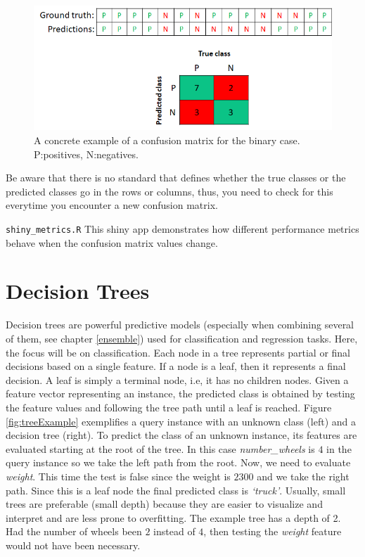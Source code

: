 \documentclass[
  11pt,
]{krantz}
\makeatletter
\newenvironment{kframe}{%
\medskip{}
\setlength{\fboxsep}{.8em}
 \def\at@end@of@kframe{}%
 \ifinner\ifhmode%
  \def\at@end@of@kframe{\end{minipage}}%
  \begin{minipage}{\columnwidth}%
 \fi\fi%
 \def\FrameCommand##1{\hskip\@totalleftmargin \hskip-\fboxsep
 \colorbox{shadecolor}{##1}\hskip-\fboxsep
     \hskip-\linewidth \hskip-\@totalleftmargin \hskip\columnwidth}%
 \MakeFramed {\advance\hsize-\width
   \@totalleftmargin\z@ \linewidth\hsize
   \@setminipage}}%
 {\par\unskip\endMakeFramed%
 \at@end@of@kframe}
\newenvironment{rmdblock}[1]
  {
  \begin{itemize}
  \renewcommand{\labelitemi}{
    \raisebox{-.7\height}[0pt][0pt]{
      {\setkeys{Gin}{width=3em,keepaspectratio}\texttt{[image: images/icons/\#1]}}
    }
  }
  \setlength{\fboxsep}{1em}
  \begin{kframe}
  \item
  }
  {
  \end{kframe}
  \end{itemize}
  }
\newenvironment{rmdcaution}
  {\begin{rmdblock}{caution}}
  {\end{rmdblock}}
\newenvironment{rmdshiny}
  {\begin{rmdblock}{touch}}
  {\end{rmdblock}}
\makeatother
\begin{document}
\begin{figure}

{\centering \includegraphics[width=0.9\linewidth]{images/binaryCM2} 

}

\caption{A concrete example of a  confusion matrix for the binary case. P:positives, N:negatives.}\label{fig:binaryCM2}
\end{figure}

\begin{rmdcaution}
Be aware that there is no standard that defines whether the true classes or the predicted classes go in the rows or columns, thus, you need to check for this everytime you encounter a new confusion matrix.
\end{rmdcaution}

\begin{rmdshiny}
\texttt{shiny\_metrics.R} This shiny app demonstrates how different performance metrics behave when the confusion matrix values change.
\end{rmdshiny}

\hypertarget{decision-trees}{%
\section{Decision Trees}\label{decision-trees}}

Decision trees are powerful predictive models (especially when combining several of them, see chapter \ref{ensemble}) used for classification and regression tasks. Here, the focus will be on classification. Each node in a tree represents partial or final decisions based on a single feature. If a node is a leaf, then it represents a final decision. A leaf is simply a terminal node, i.e, it has no children nodes. Given a feature vector representing an instance, the predicted class is obtained by testing the feature values and following the tree path until a leaf is reached. Figure \ref{fig:treeExample} exemplifies a query instance with an unknown class (left) and a decision tree (right). To predict the class of an unknown instance, its features are evaluated starting at the root of the tree. In this case \emph{number\_wheels} is \(4\) in the query instance so we take the left path from the root. Now, we need to evaluate \emph{weight}. This time the test is false since the weight is \(2300\) and we take the right path. Since this is a leaf node the final predicted class is \emph{`truck'}. Usually, small trees are preferable (small depth) because they are easier to visualize and interpret and are less prone to overfitting. The example tree has a depth of 2. Had the number of wheels been \(2\) instead of \(4\), then testing the \emph{weight} feature would not have been necessary.
\end{document}
